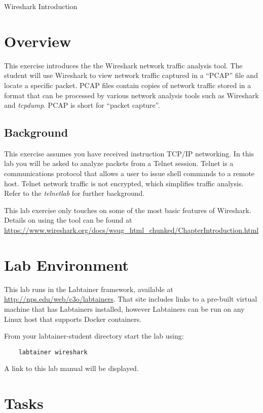 


\begin{center}
{\LARGE Wireshark Introduction}
\vspace{0.1in}\\
\end{center}


\section{Overview}
This exercise introduces the the Wireshark network traffic analysis tool.
The student will use Wireshark to view network traffic captured in a ``PCAP''
file and locate a specific packet.  PCAP files contain
copies of network traffic stored in a format that can be processed
by various network analysis tools such as Wireshark and
\textit{tcpdump}.  PCAP is short for ``packet capture''.

\subsection{Background}
This exercise assumes you have received instruction TCP/IP networking.
In this lab you will be asked to analyze packets from a Telnet session.  Telnet is a communications protocol that allows a user to 
issue shell commands to a remote host. Telnet network 
traffic is not encrypted, which simplifies traffic analysis. Refer to the \textit{telnetlab} for further background.

This lab exercise only touches on some of the most basic features of Wireshark.
Details on using the tool can be found at \url{https://www.wireshark.org/docs/wsug\_html\_chunked/ChapterIntroduction.html}

\section{Lab Environment}
This lab runs in the Labtainer framework,
available at \url{http://nps.edu/web/c3o/labtainers}.
That site includes links to a pre-built virtual machine
that has Labtainers installed, however Labtainers can
be run on any Linux host that supports Docker containers.

From your labtainer-student directory start the lab using:
\begin{verbatim}
    labtainer wireshark
\end{verbatim}
A link to this lab manual will be displayed.

\section{Tasks}
